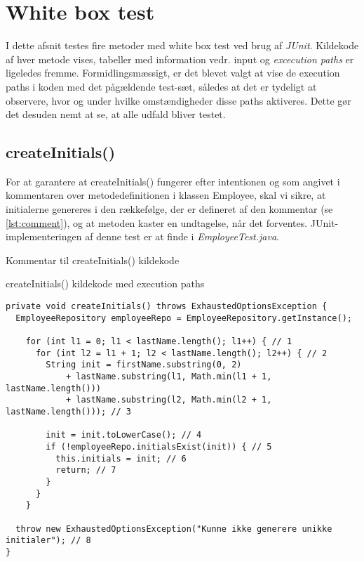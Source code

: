 \section{White box test\label{chap:white_box}}
I dette afsnit testes fire metoder med white box test ved brug af \textit{JUnit}. Kildekode af hver metode vises, tabeller med information vedr. input og \textit{excecution paths} er ligeledes fremme. Formidlingsmæssigt, er det blevet valgt at vise de execution paths i koden med det pågældende test-sæt, således at det er tydeligt at observere, hvor og under hvilke omstændigheder disse paths aktiveres. Dette gør det desuden nemt at se, at alle udfald bliver testet.

\subsection{createInitials()}\label{sec:white_box_create_initials}
For at garantere at createInitials() fungerer efter intentionen og som angivet i kommentaren over metodedefinitionen i klassen Employee, skal vi sikre, at initialerne genereres i den rækkefølge, der er defineret af den kommentar (se \cref{lst:comment}), og at metoden kaster en undtagelse, når det forventes. JUnit-implementeringen af denne test er at finde i \textit{EmployeeTest.java}.
\begin{listing}[H]
    \centering
    \caption{Kommentar til createInitials() kildekode}\label{lst:comment}
\end{listing}
\begin{listing}[H]
    \centering
    \caption{createInitials() kildekode med execution paths}\label{lst:create_initials_source}
    \begin{verbatim}
private void createInitials() throws ExhaustedOptionsException {
  EmployeeRepository employeeRepo = EmployeeRepository.getInstance();

    for (int l1 = 0; l1 < lastName.length(); l1++) { // 1
      for (int l2 = l1 + 1; l2 < lastName.length(); l2++) { // 2
        String init = firstName.substring(0, 2)
            + lastName.substring(l1, Math.min(l1 + 1, lastName.length()))
            + lastName.substring(l2, Math.min(l2 + 1, lastName.length())); // 3

        init = init.toLowerCase(); // 4
        if (!employeeRepo.initialsExist(init)) { // 5
          this.initials = init; // 6
          return; // 7
        }
      }
    }

  throw new ExhaustedOptionsException("Kunne ikke generere unikke initialer"); // 8
}
    \end{verbatim}
\end{listing}
